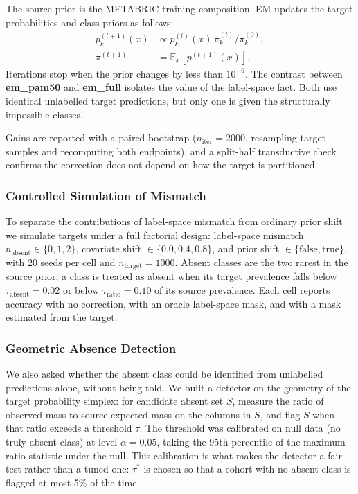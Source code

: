 \documentclass[11pt,a4paper]{article}
\begin{document}
The source prior is the METABRIC training composition. EM updates the target probabilities and
class priors as follows:
\begin{align*}
p_k^{(t+1)}(x) &\propto p_k^{(t)}(x)\, \pi_k^{(t)} / \pi_k^{(0)}, \\
\pi^{(t+1)} &= \mathbb{E}_x[p^{(t+1)}(x)].
\end{align*}
Iterations stop when the prior changes by less than $10^{-6}$. The contrast between
\textbf{em\_pam50} and \textbf{em\_full} isolates the value of the label-space fact. Both use
identical unlabelled target predictions, but only one is given the structurally impossible classes.

Gains are reported with a paired bootstrap ($n_{\text{iter}} = 2000$, resampling target samples
and recomputing both endpoints), and a split-half transductive check confirms the correction
does not depend on how the target is partitioned.

\subsubsection{Controlled Simulation of Mismatch}
\label{sec:methods_sim}

To separate the contributions of label-space mismatch from ordinary prior shift we simulate
targets under a full factorial design: label-space mismatch $n_{\text{absent}} \in \{0,1,2\}$,
covariate shift $\in \{0.0, 0.4, 0.8\}$, and prior shift $\in \{\text{false}, \text{true}\}$,
with 20 seeds per cell and $n_{\text{target}} = 1000$. Absent classes are the two rarest in the
source prior; a class is treated as absent when its target prevalence falls below
$\tau_{\text{absent}} = 0.02$ or below $\tau_{\text{ratio}} = 0.10$ of its source prevalence.
Each cell reports accuracy with no correction, with an oracle label-space mask, and with a mask
estimated from the target.

\subsubsection{Geometric Absence Detection}
\label{sec:methods_detector}

We also asked whether the absent class could be identified from unlabelled predictions alone,
without being told. We built a detector on the geometry of the target probability simplex: for
candidate absent set $S$, measure the ratio of observed mass to source-expected mass on the
columns in $S$, and flag $S$ when that ratio exceeds a threshold $\tau$. The threshold was
calibrated on null data (no truly absent class) at level $\alpha = 0.05$, taking the 95th
percentile of the maximum ratio statistic under the null. This calibration is what makes the
detector a fair test rather than a tuned one: $\tau^\ast$ is chosen so that a cohort with no
absent class is flagged at most 5\% of the time.
\end{document}
